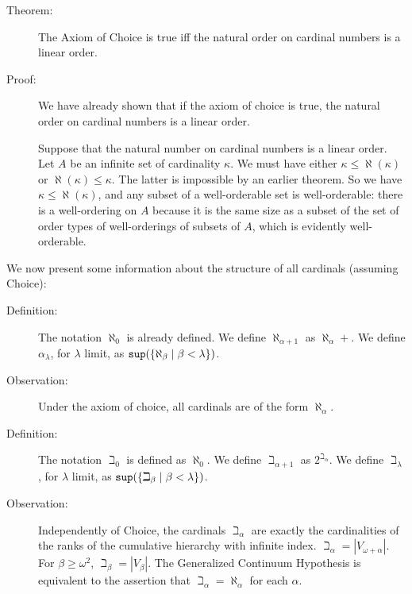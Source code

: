 \documentclass[12pt]{book}
\begin{document}
\begin{description}
\item[Theorem:]  The Axiom of Choice is true iff the natural order on cardinal numbers is a linear order.

\item[Proof:]  We have already shown that if the axiom of choice is true, the natural order on cardinal numbers is a linear order.

Suppose that the natural number on cardinal numbers is a linear order.  Let $A$ be an infinite set of cardinality $\kappa$.  We must have either $\kappa \leq \aleph(\kappa)$
or $\aleph(\kappa)\leq \kappa$.  The latter is impossible by an earlier theorem.  So we have $\kappa \leq \aleph(\kappa)$, and any subset of a well-orderable set is well-orderable:  there is a well-ordering on $A$ because it is the same size as a subset of the set of order types of well-orderings of subsets of $A$, which is evidently well-orderable.

\end{description}

We now present some information about the structure of all cardinals (assuming Choice):

\begin{description}

\item[Definition:]  The notation $\aleph_0$ is already defined.  We define $\aleph_{\alpha+1}$ as $\aleph_{\alpha}+$.  We define $\alpha_{\lambda}$, for $\lambda$ limit,
as ${\tt sup}(\{\aleph_{\beta} \mid \beta<\lambda\})$.

\item[Observation:]  Under the axiom of choice, all cardinals are of the form $\aleph_{\alpha}$.

\item[Definition:]  The notation $\beth_0$ is defined as $\aleph_0$.  We define $\beth_{\alpha+1}$ as $2^{\beth_{\alpha}}$.  We define $\beth_{\lambda}$, for $\lambda$ limit,
as ${\tt sup}(\{\beth_{\beta} \mid \beta<\lambda\})$.

\item[Observation:]  Independently of Choice, the cardinals $\beth_{\alpha}$ are exactly the cardinalities of the ranks of the cumulative hierarchy with infinite index.
$\beth_{\alpha}=|V_{\omega+\alpha}|$.  For $\beta \geq \omega^2$, $\beth_{\beta} = |V_{\beta}|$.  The Generalized Continuum Hypothesis is equivalent to the assertion
that $\beth_{\alpha} = \aleph_{\alpha}$ for each $\alpha$.

\end{description}
\end{document}
